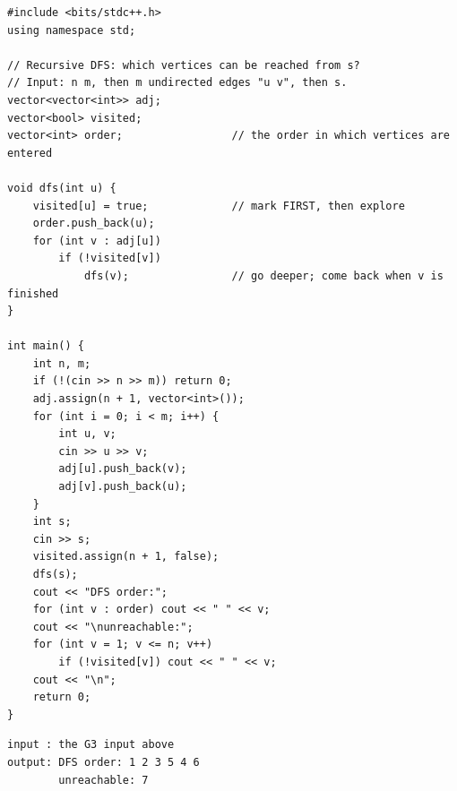 \begin{lstlisting}[style=cpp]
#include <bits/stdc++.h>
using namespace std;

// Recursive DFS: which vertices can be reached from s?
// Input: n m, then m undirected edges "u v", then s.
vector<vector<int>> adj;
vector<bool> visited;
vector<int> order;                 // the order in which vertices are entered

void dfs(int u) {
    visited[u] = true;             // mark FIRST, then explore
    order.push_back(u);
    for (int v : adj[u])
        if (!visited[v])
            dfs(v);                // go deeper; come back when v is finished
}

int main() {
    int n, m;
    if (!(cin >> n >> m)) return 0;
    adj.assign(n + 1, vector<int>());
    for (int i = 0; i < m; i++) {
        int u, v;
        cin >> u >> v;
        adj[u].push_back(v);
        adj[v].push_back(u);
    }
    int s;
    cin >> s;
    visited.assign(n + 1, false);
    dfs(s);
    cout << "DFS order:";
    for (int v : order) cout << " " << v;
    cout << "\nunreachable:";
    for (int v = 1; v <= n; v++)
        if (!visited[v]) cout << " " << v;
    cout << "\n";
    return 0;
}
\end{lstlisting}

\begin{lstlisting}[style=trace]
input : the G3 input above
output: DFS order: 1 2 3 5 4 6
        unreachable: 7
\end{lstlisting}

